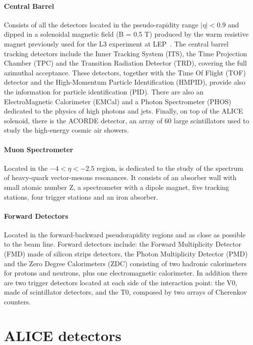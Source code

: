 \paragraph{Central Barrel}
Consists of all the detectors located in the pseudo-rapidity range $|\eta| < 0.9$ and dipped in a 
solenoidal magnetic field (B = 0.5 T) produced by the warm resistive magnet previously used for
the L3 experiment at LEP~\cite{lep}.
The central barrel  tracking detectors include the Inner Tracking System (ITS), the Time Projection 
Chamber (TPC) and the Transition Radiation Detector (TRD), covering the full azimuthal acceptance.
These detectors, together with the Time Of Flight (TOF) detector and the High-Momentum 
Particle Identification (HMPID), provide also the information for particle identification (PID).
There are also an ElectroMagnetic Calorimeter (EMCal) and a Photon Spectrometer (PHOS) dedicated to the
physics of high \pt photons and jets.
Finally, on top of the ALICE solenoid, there is the ACORDE detector, an array of 60 large scintillators
used to study the high-energy cosmic air showers.

\paragraph{Muon Spectrometer} 
Located in the $-4 < \eta < -2.5$ region, is dedicated to the study of the spectrum of 
heavy-quark vector-mesons resonances.
It consists of an absorber wall with small atomic number Z, a spectrometer with a dipole magnet,
five tracking stations, four trigger stations and an iron absorber.

\paragraph{Forward Detectors}
Located in the forward-backward pseudorapidity regions and as close as possible to the beam line.
Forward detectors include: the Forward Multiplicity Detector (FMD) made of silicon strips detectors,
the Photon
Multiplicity Detector (PMD) and the Zero Degree Calorimeters (ZDC) consisting of two hadronic 
calorimeters for protons and neutrons, plus one electromagnetic calorimeter. 
In addition there are two trigger detectors located at each side of the interaction point:
the V0, made of scintillator detectors, and the T0, composed by two arrays of Cherenkov counters.

%
%
\section{ALICE detectors} \label{sec:alice_detectors}

